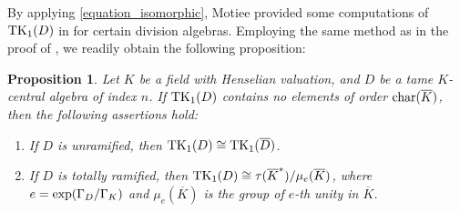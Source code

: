 \documentclass{amsart}
\newtheorem{proposition}[theorem]{Proposition}
\theoremstyle{definition}
\numberwithin{equation}{section} %
\begin{document}
By applying \eqref{equation_isomorphic}, Motiee provided some computations of ${\rm TK}_1(D)$ in \cite[Theorem 10]{motiee-13} for certain division algebras. Employing the same method as in the proof of \cite[Theorem 10]{motiee-13}, we readily obtain the following proposition:

\begin{proposition}\label{propostion_4}
	Let $K$ be a field with Henselian valuation, and $D$ be a tame $K$-central algebra of index $n$. If ${\rm TK}_1(D)$ contains no elements of order ${\rm char}(\overline{K})$, then the following assertions hold:
	\begin{enumerate}[font=\normalfont]
		\item[(i)] If $D$ is unramified, then ${\rm TK}_1(D)\cong {\rm TK}_1(\overline{D})$.
		\item[(ii)] If $D$ is totally ramified, then ${\rm TK}_1(D)\cong \tau(\overline{K}^*)/\mu_e(\overline{K})$, where $e={\rm exp}(\Gamma_D/\Gamma_K)$ and $\mu_e(\overline{K})$ is the group of $e$-th unity in $\overline{K}$.
	\end{enumerate}
\end{proposition}
\end{document}
